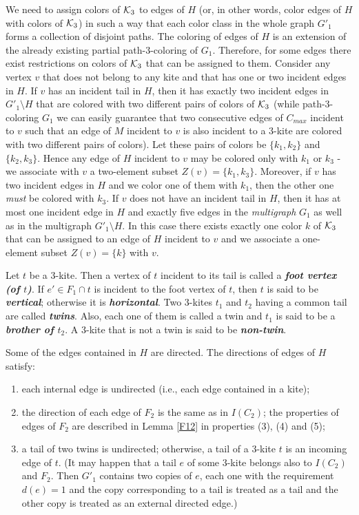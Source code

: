 \documentclass[a4, 11pt]{article}
\newcommand{\<}{\langle}
\renewcommand{\>}{\rangle}
\newcommand{\Kt}{{\cal K}_3}
\begin{document}
We need to assign colors of $\Kt$ to edges of $H$ (or, in other words, color edges of $H$ with colors of $\Kt$) in such a way that each color class in the whole graph $G'_1$  forms a collection of disjoint paths. The coloring of edges of $H$ is an extension of the already existing partial path-$3$-coloring of $G_1$. Therefore, for some edges there exist restrictions on colors of $\Kt$ that can be assigned to them. Consider any vertex $v$ that does not belong to any kite and that has one or two incident edges in $H$. If $v$ has an incident tail in $H$, then it has exactly two incident edges in $G'_1\setminus H$   that are colored with two different pairs of colors of $\Kt$ (while path-$3$-coloring $G_1$ we can easily guarantee that two consecutive edges of $C_{max}$ incident to $v$ such that an edge of $M$ incident to $v$ is also incident to a $3$-kite are colored with two different pairs of colors). Let these pairs of colors be $\{k_1, k_2\}$ and $\{k_2, k_3\}$. Hence any edge of $H$ incident to $v$ may be colored only with $k_1$ or $k_3$ - we associate with $v$  a  two-element subset $Z(v)=\{k_1, k_3\}$.  Moreover, if  $v$ has two incident edges in $H$ and we color one of them with $k_1$, then the other one {\em must} be colored with $k_3$.  If $v$ does not have an incident tail in $H$, then it has at most one incident edge in $H$ and exactly five edges in the {\em multigraph} $G_1$ as well as in the multigraph  $G'_1\setminus H$. In this case there exists exactly one color $k$  of $\Kt$ that can be assigned to an edge of $H$ incident to $v$ and we associate a one-element subset $Z(v)=\{k\}$ with $v$.


Let $t$ be a $3$-kite. Then a vertex of $t$ incident to its tail  is called a {\bf \em foot vertex (of $t$)}. If $e' \in F_1 \cap t$ is incident to the foot vertex of $t$, then $t$ is said to be {\bf \em vertical}; otherwise it is {\bf \em horizontal}.
Two $3$-kites $t_1$ and $t_2$ having a common tail are called {\bf \em twins}. Also, each one of them is called a twin and $t_1$ is said to be a {\bf \em brother of $t_2$}. A $3$-kite that is not a twin is said to be {\bf \em non-twin}.

Some of the edges contained in $H$ are directed.  The directions of edges of $H$ satisfy:

\begin{enumerate}
\item each internal edge is undirected (i.e., each edge contained in a kite);
\item the direction of each edge of $F_2$ is the same as in $I(C_2)$; the properties of edges of $F_2$ are described in Lemma \ref{F12} in properties (3), (4) and (5);

\item a tail of  two twins is undirected; otherwise, a tail of a $3$-kite $t$ is an incoming edge of $t$. (It may happen that a tail $e$ of some $3$-kite belongs also to $I(C_2)$ and $F_2$. Then $G'_1$ contains two copies of $e$, each one with the requirement $d(e)=1$ and the copy corresponding to a tail is treated as a tail and the other copy is treated as an external directed edge.)
\end{enumerate} 
\end{document}
